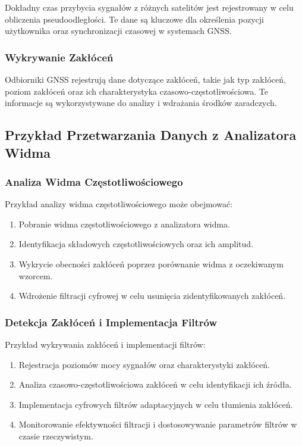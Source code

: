 Dokładny czas przybycia sygnałów z różnych satelitów jest rejestrowany w celu obliczenia pseudoodległości. Te dane są kluczowe dla określenia pozycji użytkownika oraz synchronizacji czasowej w systemach GNSS.

\subsubsection{Wykrywanie Zakłóceń}

Odbiorniki GNSS rejestrują dane dotyczące zakłóceń, takie jak typ zakłóceń, poziom zakłóceń oraz ich charakterystyka czasowo-częstotliwościowa. Te informacje są wykorzystywane do analizy i wdrażania środków zaradczych.

\subsection{Przykład Przetwarzania Danych z Analizatora Widma}

\subsubsection{Analiza Widma Częstotliwościowego}

Przykład analizy widma częstotliwościowego może obejmować:
\begin{enumerate}
    \item Pobranie widma częstotliwościowego z analizatora widma.
    \item Identyfikacja składowych częstotliwościowych oraz ich amplitud.
    \item Wykrycie obecności zakłóceń poprzez porównanie widma z oczekiwanym wzorcem.
    \item Wdrożenie filtracji cyfrowej w celu usunięcia zidentyfikowanych zakłóceń.
\end{enumerate}

\subsubsection{Detekcja Zakłóceń i Implementacja Filtrów}

Przykład wykrywania zakłóceń i implementacji filtrów:
\begin{enumerate}
    \item Rejestracja poziomów mocy sygnałów oraz charakterystyki zakłóceń.
    \item Analiza czasowo-częstotliwościowa zakłóceń w celu identyfikacji ich źródła.
    \item Implementacja cyfrowych filtrów adaptacyjnych w celu tłumienia zakłóceń.
    \item Monitorowanie efektywności filtracji i dostosowywanie parametrów filtrów w czasie rzeczywistym.
\end{enumerate}

